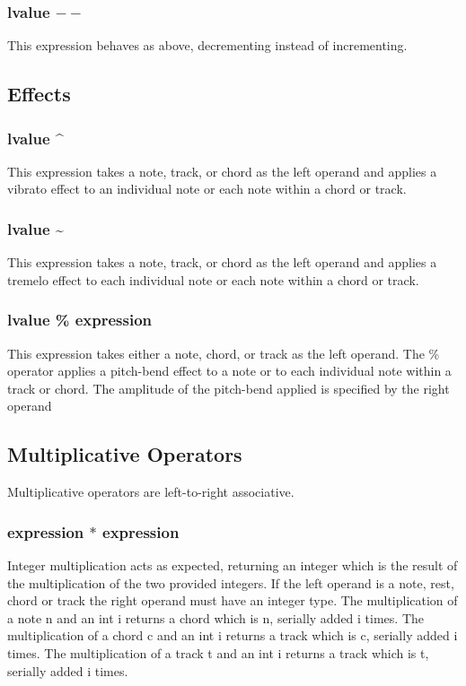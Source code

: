 \documentclass[letterpaper]{article}
\begin{document}
\subsubsection{lvalue $--$}
This expression behaves as above, decrementing instead of incrementing.
\subsection{Effects}
\subsubsection{lvalue \textasciicircum}
This expression takes a note, track, or chord as the left operand and applies a vibrato effect to an individual note or each note within a chord or track.

\subsubsection{lvalue \textasciitilde}
This expression takes a note, track, or chord as the left operand and applies a tremelo effect to each individual note or each note within a chord or track.

\subsubsection{lvalue \% expression}
This expression takes either a note, chord, or track as the left operand. The \% operator applies a pitch-bend effect to a note or to each individual note within a track or chord. The amplitude of the pitch-bend applied is specified by the right operand

\subsection{Multiplicative Operators}
Multiplicative operators are left-to-right associative.

\subsubsection{expression $*$ expression}
Integer multiplication acts as expected, returning an integer which is the result of the multiplication of the two provided integers. If the left operand is a note, rest, chord or track the right operand must have an integer type.  The multiplication of a note n and an int i returns a chord which is n, serially added i times. The multiplication of a chord c and an int i returns a track which is c, serially added i times. The multiplication of a track t and an int i returns a track which is t, serially added i times.
\end{document}
